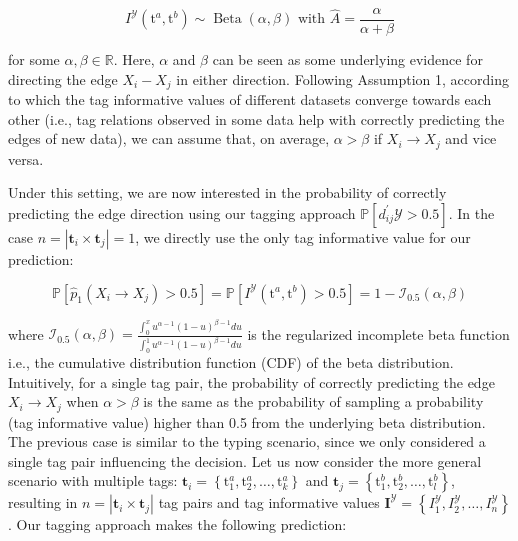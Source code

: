 \documentclass[10pt]{article}
\begin{document}
\begin{equation*}
I^{\mathcal{Y}}\left(\mathrm{t}^{a}, \mathrm{t}^{b}\right) \sim \operatorname{Beta}(\alpha, \beta) \text { with } \hat{A}=\frac{\alpha}{\alpha+\beta} \tag{7}
\end{equation*}


for some $\alpha, \beta \in \mathbb{R}$. Here, $\alpha$ and $\beta$ can be seen as some underlying evidence for directing the edge $X_{i}-X_{j}$ in either direction. Following Assumption 1, according to which the tag informative values of different datasets converge towards each other (i.e., tag relations observed in some data help with correctly predicting the edges of new data), we can assume that, on average, $\alpha>\beta$ if $X_{i} \rightarrow X_{j}$ and vice versa.

Under this setting, we are now interested in the probability of correctly predicting the edge direction using our tagging approach $\mathbb{P}\left[d_{i j}^{\prime} \mathcal{Y}>0.5\right]$. In the case $n=\left|\mathbf{t}_{i} \times \mathbf{t}_{j}\right|=1$, we directly use the only tag informative value for our prediction:


\begin{equation*}
\mathbb{P}\left[\hat{p}_{1}\left(X_{i} \rightarrow X_{j}\right)>0.5\right]=\mathbb{P}\left[I^{\mathcal{Y}}\left(\mathrm{t}^{a}, \mathrm{t}^{b}\right)>0.5\right]=1-\mathcal{I}_{0.5}(\alpha, \beta) \tag{8}
\end{equation*}


where $\mathcal{I}_{0.5}(\alpha, \beta)=\frac{\int_{0}^{x} u^{\alpha-1}(1-u)^{\beta-1} d u}{\int_{0}^{1} u^{\alpha-1}(1-u)^{\beta-1} d u}$ is the regularized incomplete beta function i.e., the cumulative distribution function (CDF) of the beta distribution. Intuitively, for a single tag pair, the probability of correctly predicting the edge $X_{i} \rightarrow X_{j}$ when $\alpha>\beta$ is the same as the probability of sampling a probability (tag informative value) higher than 0.5 from the underlying beta distribution.\\
The previous case is similar to the typing scenario, since we only considered a single tag pair influencing the decision. Let us now consider the more general scenario with multiple tags: $\mathbf{t}_{i}= \left\{\mathrm{t}_{1}^{a}, \mathrm{t}_{2}^{a}, \ldots, \mathrm{t}_{k}^{a}\right\}$ and $\mathbf{t}_{j}=\left\{\mathrm{t}_{1}^{b}, \mathrm{t}_{2}^{b}, \ldots, \mathrm{t}_{l}^{b}\right\}$, resulting in $n=\left|\mathbf{t}_{i} \times \mathbf{t}_{j}\right|$ tag pairs and tag informative values $\mathbf{I}^{\mathcal{Y}}=\left\{I_{1}^{\mathcal{Y}}, I_{2}^{\mathcal{Y}}, \ldots, I_{n}^{\mathcal{Y}}\right\}$. Our tagging approach makes the following prediction:
\end{document}
